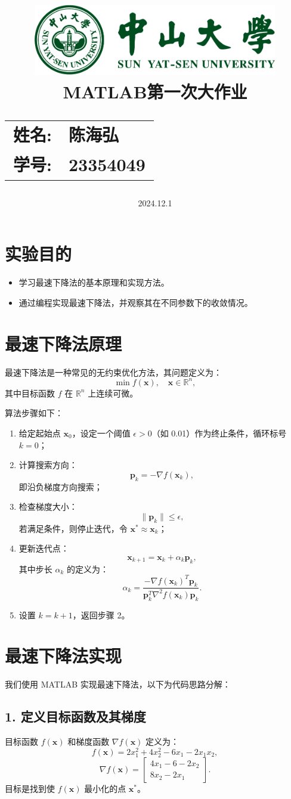 \documentclass[12pt,a4paper,oneside]{article}
\author{}
\title{
    \vspace*{-2cm} %
    \includegraphics[width=0.8\textwidth]{SYSULogo.pdf} \\[1em]
    \vfill %
    \LARGE \textbf{MATLAB第一次大作业} \\[1em]
    \Large
    \begin{tabular}{rl}
        \textbf{姓名:} & \textbf{陈海弘} \\
        \textbf{学号:} & \textbf{23354049}
    \end{tabular}
    \vfill %
}
\date{\Large 2024.12.1}
\begin{document}
\maketitle

\newpage
\tableofcontents
\newpage
\section{实验目的}
\begin{itemize}
    \item 学习最速下降法的基本原理和实现方法。
    \item 通过编程实现最速下降法，并观察其在不同参数下的收敛情况。
\end{itemize}
\section{最速下降法原理}


最速下降法是一种常见的无约束优化方法，其问题定义为：
\[
\min f(\mathbf{x}), \quad \mathbf{x} \in \mathbb{R}^n,
\]
其中目标函数 \(f\) 在 \(\mathbb{R}^n\) 上连续可微。

算法步骤如下：
\begin{enumerate}
    \item 给定起始点 \(\mathbf{x}_0\)，设定一个阈值 \(\epsilon > 0\)（如 0.01）作为终止条件，循环标号 \(k = 0\)；
    \item 计算搜索方向：
    \[
    \mathbf{p}_k = -\nabla f(\mathbf{x}_k),
    \]
    即沿负梯度方向搜索；
    \item 检查梯度大小：
    \[
    \|\mathbf{p}_k\| \leq \epsilon,
    \]
    若满足条件，则停止迭代，令 \(\mathbf{x}^* \approx \mathbf{x}_k\)；
    \item 更新迭代点：
    \[
    \mathbf{x}_{k+1} = \mathbf{x}_k + \alpha_k \mathbf{p}_k,
    \]
    其中步长 \(\alpha_k\) 的定义为：
    \[
    \alpha_k = \frac{-\nabla f(\mathbf{x}_k)^T \mathbf{p}_k}{\mathbf{p}_k^T \nabla^2 f(\mathbf{x}_k) \mathbf{p}_k}.
    \]
    \item 设置 \(k = k + 1\)，返回步骤 2。
\end{enumerate}

\section{最速下降法实现}
我们使用 MATLAB 实现最速下降法，以下为代码思路分解：

\subsection*{1. 定义目标函数及其梯度}
目标函数 \(f(\mathbf{x})\) 和梯度函数 \(\nabla f(\mathbf{x})\) 定义为：
\[
f(\mathbf{x}) = 2x_1^2 + 4x_2^2 - 6x_1 - 2x_1x_2,
\]
\[
\nabla f(\mathbf{x}) = 
\begin{bmatrix}
4x_1 - 6 - 2x_2 \\
8x_2 - 2x_1
\end{bmatrix}.
\]
目标是找到使 \(f(\mathbf{x})\) 最小化的点 \(\mathbf{x}^*\)。
\end{document}
